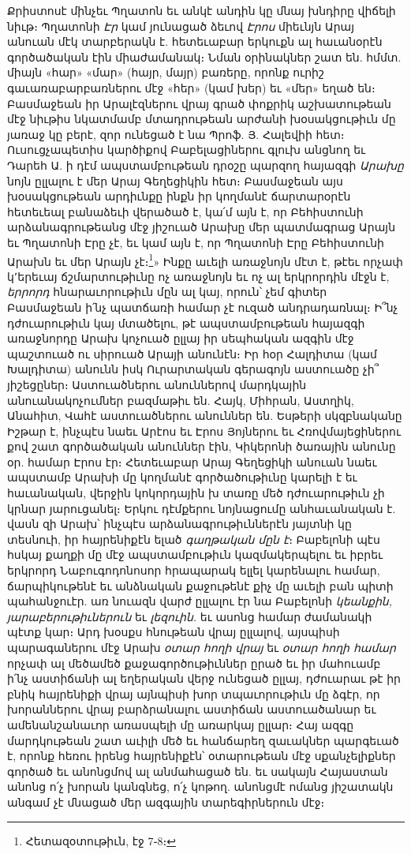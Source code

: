 \documentclass{article}
\begin{document}
{Քրիստոսէ մինչեւ Պղատոն եւ անկէ անդին կը մնայ խնդիրը վիճելի նիւթ։ Պղատոնի \emph{Էր} կամ յունացած ձեւով \emph{Էրոս} միեւնյն Արայ անուան մէկ տարբերակն է. հետեւաբար երկուքն ալ հաւանօրէն գործածական էին միաժամանակ։ Նման օրինակներ շատ են. հմմտ. միայն «հար» «մար» (հայր, մայր) բառերը, որոնք ուրիշ գաւառաբարբառներու մէջ «հեր» (կամ խեր) եւ «մեր» եղած են։ Բասմաջեան իր Արալէզներու վրայ գրած փոքրիկ աշխատութեան մէջ նիւթիս նկատմամբ մտադրութեան արժանի խօսակցութիւն մը յառաջ կը բերէ, զոր ունեցած է նա Պրոֆ. Յ. Հալեվիի հետ։ Ուսուցչապետիս կարծիքով Բաբելացիներու գլուխ անցնող եւ Դարեհ Ա. ի դէմ ապստամբութեան դրօշը պարզող հայազգի \emph{Արախը} նոյն ըլլալու է մեր Արայ Գեղեցիկին հետ։ Բասմաջեան այս խօսակցութեան արդիւնքը ինքն իր կողմանէ ճարտարօրէն հետեւեալ բանաձեւի վերածած է, կա՛մ այն է, որ Բեհիստունի արձանագրութեանց մէջ յիշուած Արախը մեր պատմագրաց Արայն եւ Պղատոնի Էրը չէ, եւ կամ այն է, որ Պղատոնի Էրը Բեհիստունի Արախն եւ մեր Արայն չէ։\footnote{Հետազօտութիւն, էջ 7֊8։ }» Ինքը աւելի առաջնոյն մէտ է, թէեւ որչափ կ՚երեւայ ճշմարտութիւնը ոչ առաջնոյն եւ ոչ ալ երկրորդին մէջն է, \emph{երրորդ} հնարաւորութիւն մըն ալ կայ, որուն՝ չեմ գիտեր Բասմաջեան ի՛նչ պատճառի համար չէ ուզած անդրադառնալ։ Ի՞նչ դժուարութիւն կայ մտածելու, թէ ապստամբութեան հայազգի առաջնորդը Արախ կոչուած ըլլայ իր սեպհական ազգին մէջ պաշտուած ու սիրուած Արայի անունէն։ Իր հօր Հալդիտա (կամ Խալդիտա) անունն իսկ Ուրարտական գերագոյն աստուածը չի՞ յիշեցըներ։ Աստուածներու անուններով մարդկային անուանակոչումներ բազմաթիւ են. Հայկ, Միհրան, Աստղիկ, Անահիտ, Վահէ աստուածներու անուններ են. Եսթերի սկզբնականը Իշթար է, ինչպէս նաեւ Արէոս եւ Էրոս Յոյներու եւ Հռովմայեցիներու քով շատ գործածական անուններ էին, Կիկերոնի ծառային անունը օր. համար Էրոս էր։ Հետեւաբար Արայ Գեղեցիկի անուան նաեւ ապստամբ Արախի մը կողմանէ գործածութիւնը կարելի է եւ հաւանական, վերջին կոկորդային խ տառը մեծ դժուարութիւն չի կրնար յարուցանել։ Երկու դէմքերու նոյնացումը անհաւանական է. վասն զի Արախ՝ ինչպէս արձանագրութիւններէն յայտնի կը տեսնուի, իր հայրենիքէն ելած \emph{գաղթական մըն է}։ Բաբելոնի պէս հսկայ քաղքի մը մէջ ապստամբութիւն կազմակերպելու եւ իբրեւ երկրորդ Նաբուգոդոնոսոր հրապարակ ելլել կարենալու համար, ճարպիկութենէ եւ անձնական քաջութենէ քիչ մը աւելի բան պիտի պահանջուէր. առ նուազն վարժ ըլլալու էր նա Բաբելոնի \emph{կեանքին, յարաբերութիւներուն} եւ \emph{լեզուին.} եւ ասոնց համար ժամանակի պէտք կար։ Արդ խօսքս հնութեան վրայ ըլլալով, այսպիսի պարագաներու մէջ Արախ \emph{օտար հողի վրայ} եւ \emph{օտար հողի համար} որչափ ալ մեծամեծ քաջագործութիւններ ըրած եւ իր մահուամբ ի՛նչ աստիճանի ալ եղերական վերջ ունեցած ըլլայ, դժուարաւ թէ իր բնիկ հայրենիքի վրայ այնպիսի խոր տպաւորութիւն մը ձգէր, որ խորաններու վրայ բարձրանալու աստիճան աստուածանար եւ ամենանշանաւոր առասպելի մը առարկայ ըլլար։ Հայ ազգը մարդկութեան շատ աւիլի մեծ եւ հանճարեղ զաւակներ պարգեւած է, որոնք հեռու իրենց հայրենիքէն՝ օտարութեան մէջ սքանչելիքներ գործած եւ անոնցմով ալ անմահացած են. եւ սակայն Հայաստան անոնց ո՛չ խորան կանգնեց, ո՛չ կոթող. անոնցմէ ոմանց յիշատակն անգամ չէ մնացած մեր ազգային տարեգիրներուն մէջ։

}
\end{document}
